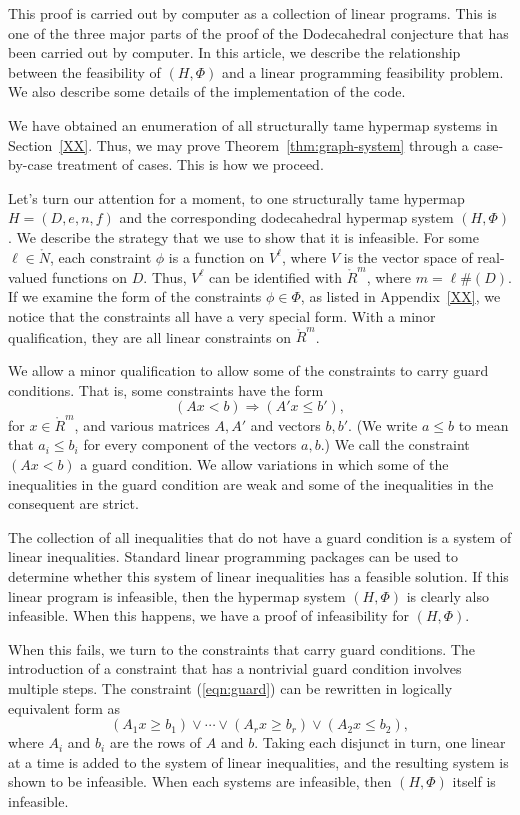 This proof is carried out by computer as a collection of linear
programs.  This is one of the three major parts of the proof
of the Dodecahedral conjecture that has been carried out by computer.
In this article, we describe the relationship between the
feasibility of $(H,\Phi)$ and a linear programming feasibility
problem.  We also describe some details of the implementation of 
the code.

We have obtained an enumeration of all structurally tame
hypermap systems in Section~\ref{XX}.  Thus,  we may prove
Theorem~\ref{thm:graph-system} through a case-by-case treatment
of cases.  This is how we proceed.

Let's turn our attention for a moment, to one structurally tame hypermap $H=(D,e,n,f)$ and the corresponding dodecahedral hypermap system $(H,\Phi)$.
We describe the strategy that we use to show that it is infeasible.
For some $\ell\in\ring{N}$,
each constraint $\phi$ is a function on $V^\ell$, where $V$ is
the vector space of real-valued functions on $D$.  Thus,
$V^\ell$ can be identified with $\ring{R}^m$, where $m= \ell \#(D)$.
If we examine the form of the constraints $\phi\in \Phi$, as listed
in Appendix~\ref{XX}, we notice that the constraints all have a 
very special form.  With a minor qualification, they are all linear constraints
on $\ring{R}^m$.  

We allow a minor qualification to allow some of the constraints
to carry guard conditions.  That is, some constraints have the form
  \begin{equation}\label{eqn:guard}
  (A x < b)  \Rightarrow (A' x \le b'),
  \end{equation}
for $x\in\ring{R}^m$, and various matrices $A,A'$ and vectors
$b,b'$.  (We write $a \le b$ to mean
that $a_i\le b_i$ for every component of the vectors $a,b$.)
We call the constraint $(A x < b)$ a guard condition.
We allow variations in which some of the inequalities in the
guard condition are weak and some of the inequalities in the
consequent are strict.

The collection of all inequalities that do not have a guard 
condition is a system of linear inequalities.  Standard linear
programming packages can be used to determine whether this
system of linear inequalities has a feasible solution.  If this
linear program is infeasible, then the hypermap system $(H,\Phi)$
is clearly also infeasible.  When this happens, we have a
proof of infeasibility for $(H,\Phi)$.

When this fails, we turn to the constraints that carry guard
conditions.
The introduction of a constraint that has a nontrivial guard condition
involves multiple steps.  
The constraint (\ref{eqn:guard}) can be rewritten in logically
equivalent form as
  $$
   (A_{1} x \ge b_{1}) \lor \cdots \lor
   (A_{r} x \ge b_{r}) \lor (A_2 x \le b_2),
  $$
where $A_{i}$ and $b_{i}$ are the rows of $A$ and $b$.
Taking each disjunct in turn, one linear at a time
is added to the system
of linear inequalities, and the resulting system is shown to be
infeasible.  When each
systems are infeasible, then $(H,\Phi)$ itself is infeasible.

